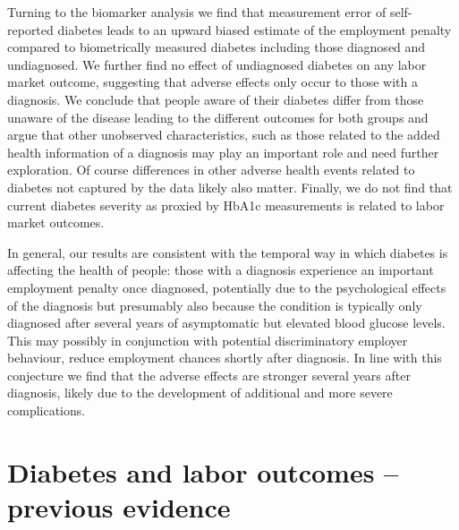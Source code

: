 \documentclass[12pt,english,british]{article}
\begin{document}
Turning to the biomarker analysis we find that measurement error of self-reported diabetes leads to an upward biased estimate of the employment penalty compared to biometrically measured diabetes including those diagnosed and undiagnosed. We further find no effect of undiagnosed diabetes on any labor market outcome, suggesting that adverse effects only occur to those with a diagnosis. We conclude that people aware of their diabetes differ from those unaware of the disease leading to the different outcomes for both groups and argue that other unobserved characteristics, such as those related to the added health information of a diagnosis may play an important role and need further exploration. Of course differences in other adverse health events related to diabetes not captured by the data likely also matter. Finally, we do not find that current diabetes severity as proxied by \ac{HbA1c} measurements is related to labor market outcomes.

In general, our results are consistent with the temporal  way in which diabetes is affecting the health of people: those with a diagnosis experience an important employment penalty once diagnosed, potentially due to the psychological effects of the diagnosis but presumably also because the condition is typically only diagnosed after several years of asymptomatic but elevated blood glucose levels. This may possibly in conjunction with potential discriminatory employer behaviour, reduce employment chances shortly after diagnosis. In line with this conjecture we find that the adverse effects are stronger several years after diagnosis, likely due to the development of additional and more severe complications.



\section{\label{sec:Labor outcomes and diabetes literature} Diabetes and labor outcomes -- previous evidence }
\end{document}
